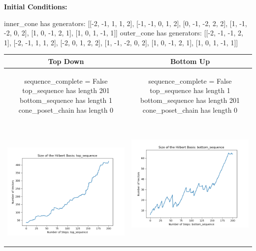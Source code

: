 \documentclass[10pt]{article}
\begin{document}
\textbf{Initial Conditions:}
\begin{SAGE}
inner_cone has generators: 
[[-2, -1, 1, 1, 2], [-1, -1, 0, 1, 2], [0, -1, -2, 2, 2], [1, -1, -2, 0, 2], [1, 0, -1, 2, 1], [1, 0, 1, -1, 1]]
outer_cone has generators: 
[[-2, -1, -1, 2, 1], [-2, -1, 1, 1, 2], [-2, 0, 1, 2, 2], [1, -1, -2, 0, 2], [1, 0, -1, 2, 1], [1, 0, 1, -1, 1]]

\end{SAGE}
\begin{tabular}{c|c}
\textbf{Top Down} & \textbf{Bottom Up} \\ \hline  
\begin{SAGE}
	sequence_complete = False
	top_sequence has length 201
	bottom_sequence has length 1
	cone_poset_chain has length 0
\end{SAGE} 
&
\begin{SAGE}
	sequence_complete = False
	top_sequence has length 1
	bottom_sequence has length 201
	cone_poset_chain has length 0
\end{SAGE} 
\\ \hline
\
\begin{minipage}{.45\textwidth}
\includegraphics[width=\textwidth]{"DATA/5d/6 generators 2 bound B/top_sequence SIZE"}
\end{minipage} &
\begin{minipage}{.45\textwidth}
\includegraphics[width=\textwidth]{"DATA/5d/6 generators 2 bound B bottomup/bottom_sequence SIZE"}

\end{minipage}
\end{tabular}
\end{document}
